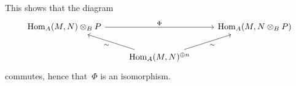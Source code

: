 This shows that the diagram
\[
  \begin{tikzcd}
      \Hom_A(M, N) \tensor_B P
      \arrow{rr}[above]{\Phi}
    & {}
    & \Hom_A(M, N \tensor_B P)
    \\
      {}
    & \Hom_A(M, N)^{\oplus n}
      \arrow{ul}[below left]{\sim}
      \arrow{ur}[below right]{\sim}
    & {}
  \end{tikzcd}
\]
commutes, hence that~$\Phi$ is an isomorphism.




